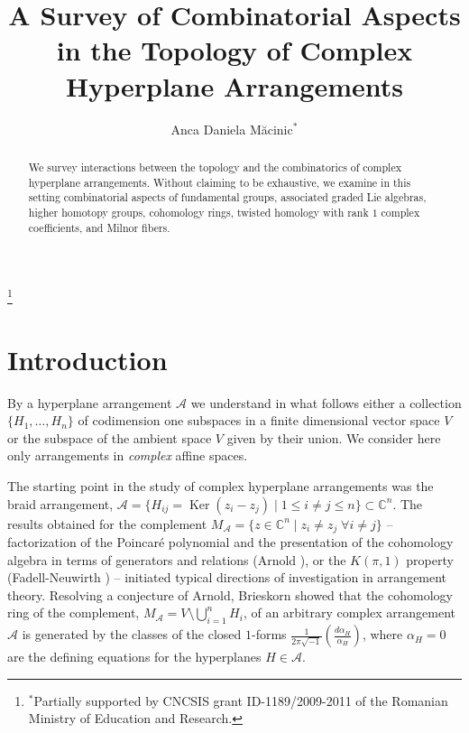 \documentclass[psamsfonts]{conm-p-l}
\theoremstyle{definition}
\theoremstyle{remark}
\numberwithin{equation}{section}
\newcommand{\A}{{\mathcal A}}
\newcommand{\C}{\mathbb{C}}
\DeclareMathOperator{\Ker}{Ker}
\begin{document}
\title[Combinatorics and Topology of Hyperplane Arrangements]{%
A Survey of Combinatorial Aspects in the Topology of Complex Hyperplane Arrangements}

\author[A.~D.~Macinic]{Anca Daniela M\u acinic$^*$}
\address{Inst. of Math. Simion Stoilow\\
P.O. Box 1-764\\
RO-014700 Bucharest, Romania}
\thanks{$^*$Partially supported by CNCSIS grant ID-1189/2009-2011 of the
Romanian Ministry of Education and Research.}




\begin{abstract}
We survey interactions between the topology and the combinatorics of complex hyperplane arrangements. 
Without claiming to be exhaustive, we examine in this setting combinatorial aspects of
fundamental groups, associated graded Lie algebras, higher homotopy groups, cohomology rings,
twisted homology with rank $1$ complex coefficients, and Milnor fibers.
\end{abstract}

\maketitle

\section{Introduction}
\label{sect:intro}

By a hyperplane arrangement $\A$ we understand in what follows either a collection $\{ H_1,\dots, H_n \}$ of codimension one subspaces
in a finite dimensional vector space $V$ or the subspace of the ambient space $V$ given by their union. We consider here only arrangements in {\em complex}
affine  spaces.

The starting point in the study of complex hyperplane arrangements was the braid 
arrangement, $\A=\{H_{ij}=\Ker(z_i-z_j)\;|\; 1\le i\neq j \le n \} \subset \C^n$. 
The results obtained for the complement $M_{\A}= \{z \in \C^n\;|\; z_i \neq z_j\; \forall i \neq j\}$ -- 
factorization of the Poincar\' e polynomial and the presentation of the cohomology algebra in terms 
of generators and relations  (Arnold \cite{Ar}), or the $K(\pi,1)$ property (Fadell-Neuwirth \cite{FN}) --
initiated typical directions of investigation in arrangement theory.
Resolving a conjecture of Arnold, Brieskorn showed that the cohomology ring of the complement,
$M_{\A}= V \setminus \bigcup_{i=1}^n H_i$, of an
arbitrary complex arrangement $\A$  is generated by the classes of the closed $1$-forms 
$\frac{1}{2 \pi \sqrt{-1}}(\frac{d \alpha_H}{\alpha_H})$, where $\alpha_H=0$ are the defining equations for
the hyperplanes $H \in \A$.
\end{document}
